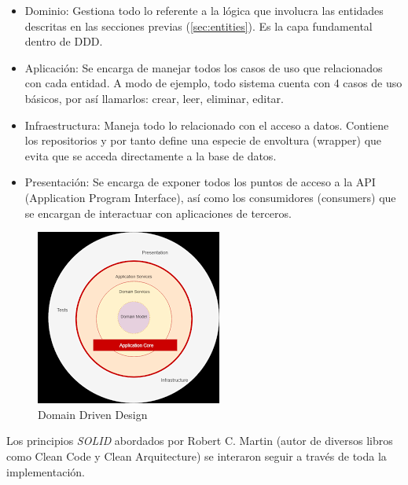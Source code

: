 \begin{itemize}
	\item Dominio: Gestiona todo lo referente a la lógica que involucra las entidades descritas en las secciones previas (\ref{sec:entities}). Es la capa fundamental dentro de DDD.
	\item Aplicación: Se encarga de manejar todos los casos de uso que relacionados con cada entidad. A modo de ejemplo, todo sistema cuenta con 4 casos de uso básicos, por así llamarlos: crear, leer, eliminar, editar.
	\item Infraestructura: Maneja todo lo relacionado con el acceso a datos. Contiene los repositorios y por tanto define una especie de envoltura (wrapper) que evita que se acceda directamente a la base de datos.
	\item Presentación: Se encarga de exponer todos los puntos de acceso a la API (Application Program Interface), así como los consumidores (consumers) que se encargan de interactuar con aplicaciones de terceros.
\end{itemize}

\begin{figure}[h]
	\centering
	\includegraphics[width=0.5\linewidth]{images/Chapter 2/ddd}
	\caption{Domain Driven Design}
	\label{fig:ddd}
\end{figure}


Los principios \textit{SOLID} abordados por Robert C. Martin (autor de diversos libros como Clean Code y Clean Arquitecture) se interaron seguir a través de toda la implementación.\cite{solid_medium}



